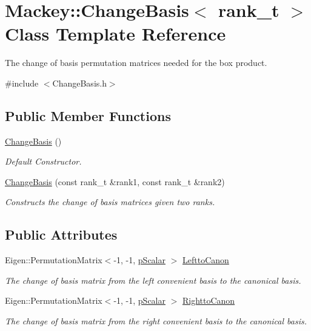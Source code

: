 \hypertarget{classMackey_1_1ChangeBasis}{}\section{Mackey\+:\+:Change\+Basis$<$ rank\+\_\+t $>$ Class Template Reference}
\label{classMackey_1_1ChangeBasis}


The change of basis permutation matrices needed for the box product.  




{\ttfamily \#include $<$Change\+Basis.\+h$>$}

\subsection*{Public Member Functions}
\begin{DoxyCompactItemize}
\item 
\hyperlink{classMackey_1_1ChangeBasis_a7edd090a5261e776f8e0221541822a87}{Change\+Basis} ()
\begin{DoxyCompactList}\small\item\em Default Constructor. \end{DoxyCompactList}\item 
\hyperlink{classMackey_1_1ChangeBasis_a036c1f54ffb4cf4115efa2fab60c354b}{Change\+Basis} (const rank\+\_\+t \&rank1, const rank\+\_\+t \&rank2)
\begin{DoxyCompactList}\small\item\em Constructs the change of basis matrices given two ranks. \end{DoxyCompactList}\end{DoxyCompactItemize}
\subsection*{Public Attributes}
\begin{DoxyCompactItemize}
\item 
Eigen\+::\+Permutation\+Matrix$<$-\/1, -\/1, \hyperlink{namespaceMackey_a4f147e328c520f568f5d3adf1c75f514}{p\+Scalar} $>$ \hyperlink{classMackey_1_1ChangeBasis_aac6a5b932e7feea82c94447d541e6ded}{Leftto\+Canon}
\begin{DoxyCompactList}\small\item\em The change of basis matrix from the left convenient basis to the canonical basis. \end{DoxyCompactList}\item 
Eigen\+::\+Permutation\+Matrix$<$-\/1, -\/1, \hyperlink{namespaceMackey_a4f147e328c520f568f5d3adf1c75f514}{p\+Scalar} $>$ \hyperlink{classMackey_1_1ChangeBasis_abde8b2dd297be6e5bff1f72c2a3cd208}{Rightto\+Canon}
\begin{DoxyCompactList}\small\item\em The change of basis matrix from the right convenient basis to the canonical basis. \end{DoxyCompactList}\end{DoxyCompactItemize}



